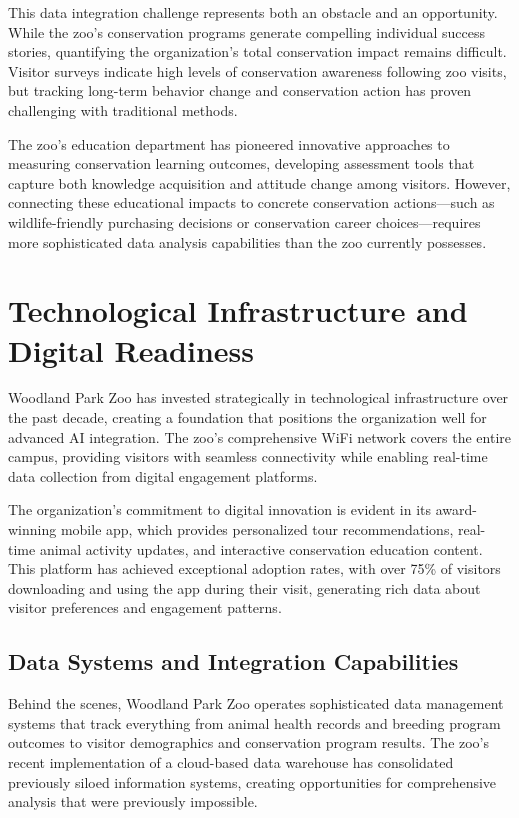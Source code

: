 \documentclass[
  Letterpaper,
]{scrbook}
\begin{document}
This data integration challenge represents both an obstacle and an
opportunity. While the zoo's conservation programs generate compelling
individual success stories, quantifying the organization's total
conservation impact remains difficult. Visitor surveys indicate high
levels of conservation awareness following zoo visits, but tracking
long-term behavior change and conservation action has proven challenging
with traditional methods.

The zoo's education department has pioneered innovative approaches to
measuring conservation learning outcomes, developing assessment tools
that capture both knowledge acquisition and attitude change among
visitors. However, connecting these educational impacts to concrete
conservation actions---such as wildlife-friendly purchasing decisions or
conservation career choices---requires more sophisticated data analysis
capabilities than the zoo currently possesses.

\section{Technological Infrastructure and Digital
Readiness}\label{technological-infrastructure-and-digital-readiness}

Woodland Park Zoo has invested strategically in technological
infrastructure over the past decade, creating a foundation that
positions the organization well for advanced AI integration. The zoo's
comprehensive WiFi network covers the entire campus, providing visitors
with seamless connectivity while enabling real-time data collection from
digital engagement platforms.

The organization's commitment to digital innovation is evident in its
award-winning mobile app, which provides personalized tour
recommendations, real-time animal activity updates, and interactive
conservation education content. This platform has achieved exceptional
adoption rates, with over 75\% of visitors downloading and using the app
during their visit, generating rich data about visitor preferences and
engagement patterns.

\subsection{Data Systems and Integration
Capabilities}\label{data-systems-and-integration-capabilities}

Behind the scenes, Woodland Park Zoo operates sophisticated data
management systems that track everything from animal health records and
breeding program outcomes to visitor demographics and conservation
program results. The zoo's recent implementation of a cloud-based data
warehouse has consolidated previously siloed information systems,
creating opportunities for comprehensive analysis that were previously
impossible.
\end{document}
